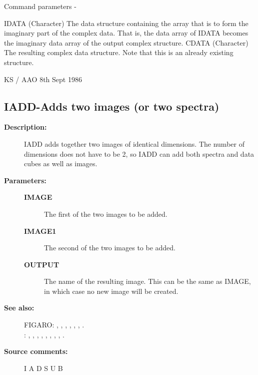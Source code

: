 \begin{description}
\begin{description}
\begin{terminalv}
 Command parameters -

 IDATA       (Character) The data structure containing the array
             that is to form the imaginary part of the complex data.
             That is, the data array of IDATA becomes the
             imaginary data array of the output complex structure.
 CDATA       (Character) The resulting complex data structure.  Note
             that this is an already existing structure.

                                         KS / AAO 8th Sept 1986
\end{terminalv}
\end{description}
\subsection{IADD-\label{IADD}Adds two images (or two spectra)}
\begin{description}

\item [\textbf{Description:}]
 IADD adds together two images of identical dimensions.
 The number of dimensions does not have to be 2, so IADD
 can add both spectra and data cubes as well as images.

\item [\textbf{Parameters:}]
\begin{description}
\item [\textbf{IMAGE}]
 The first of the two images to be added.
\item [\textbf{IMAGE1}]
 The second of the two images to be added.
\item [\textbf{OUTPUT}]
 The name of the resulting image.  This can be the same
 as IMAGE, in which case no new image will be created.
\end{description}

\item [\textbf{See also:}]
FIGARO: , , , , , , .\\
: , , , , , , , , .\\

\item [\textbf{Source comments:}]
\begin{terminalv}
 I A D S U B


\end{terminalv}
\end{description}
\end{description}
